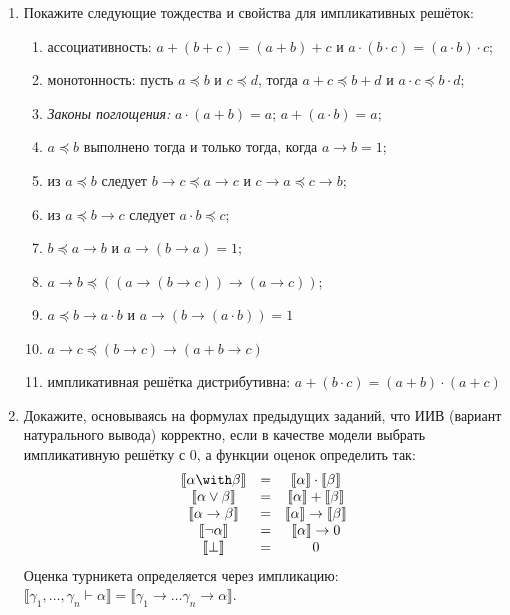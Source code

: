 \documentclass[10pt,a4paper,oneside]{article}
\begin{document}
\begin{enumerate}
\item Покажите следующие тождества и свойства для импликативных решёток:
\begin{enumerate}
\item ассоциативность: $a + (b + c) = (a + b) + c$ и $a \cdot (b \cdot c) = (a \cdot b) \cdot c$;
\item монотонность: пусть $a \preceq b$ и $c \preceq d$, тогда $a + c \preceq b + d$ и $a \cdot c \preceq b \cdot d$;
\item \emph{Законы поглощения:} $a \cdot (a + b) = a$; $a + (a \cdot b) = a$;
\item $a \preceq b$ выполнено тогда и только тогда, когда $a \rightarrow b = 1$;
\item из $a \preceq b$ следует $b\rightarrow c \preceq a\rightarrow c$ и $c\rightarrow a \preceq c \rightarrow b$;
\item из $a \preceq b \rightarrow c$ следует $a \cdot b \preceq c$;
\item $b \preceq a \rightarrow b$ и $a \rightarrow (b \rightarrow a) = 1$;
\item $a \rightarrow b \preceq ((a \rightarrow (b \rightarrow c)) \rightarrow (a \rightarrow c))$;
\item $a \preceq b \rightarrow a \cdot b$ и $a \rightarrow (b \rightarrow (a \cdot b)) = 1$
\item $a \rightarrow c \preceq (b \rightarrow c) \rightarrow (a + b \rightarrow c)$
\item импликативная решётка дистрибутивна: $a + (b \cdot c) = (a + b) \cdot (a + c)$
\end{enumerate}

\item Докажите, основываясь на формулах предыдущих заданий, что ИИВ (вариант натурального вывода) 
корректно, если в качестве модели выбрать импликативную решётку с 0, а функции оценок определить так:
$$\begin{array}{ccc}
  \llbracket\alpha \with \beta\rrbracket & = & \llbracket\alpha\rrbracket \cdot \llbracket\beta\rrbracket \\
  \llbracket\alpha \vee \beta\rrbracket & = & \llbracket\alpha\rrbracket + \llbracket\beta\rrbracket \\
  \llbracket\alpha \rightarrow \beta\rrbracket & = & \llbracket\alpha\rrbracket \rightarrow \llbracket\beta\rrbracket \\
  \llbracket\neg\alpha\rrbracket & = & \llbracket\alpha\rrbracket \rightarrow 0 \\
  \llbracket\bot\rrbracket & = & 0 \\
\end{array}$$
Оценка турникета определяется через импликацию: 
$\llbracket \gamma_1,\dots,\gamma_n \vdash \alpha \rrbracket = \llbracket \gamma_1 \rightarrow \dots \gamma_n \rightarrow \alpha\rrbracket$.

\end{enumerate}
\end{document}
